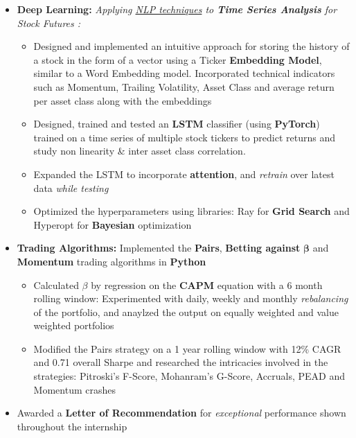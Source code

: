 \documentclass{article}
\begin{document}
\begin{itemize}[itemsep = -1 mm, leftmargin=*]
    \item \textbf{Deep Learning: }{\it Applying \underline{NLP techniques} to \textbf{Time Series Analysis} for Stock Futures :}
    \vspace{-6pt}
    \begin{itemize}[itemsep = -0.75 mm, leftmargin=*]
      \item Designed and implemented an intuitive approach for storing the history of a stock in the form of a vector using a Ticker \textbf{Embedding Model}, similar to a Word Embedding model. Incorporated technical indicators such as Momentum, Trailing Volatility, Asset Class and average return per asset class along with the embeddings
     \item Designed, trained and tested an \textbf{LSTM} classifier (using \textbf{PyTorch}) trained on a time series of multiple stock tickers to predict returns and study non linearity \& inter asset class correlation. 
     \item Expanded the LSTM to incorporate \textbf{attention}, and \textit{retrain} over latest data \textit{while testing}
     \item Optimized the hyperparameters using libraries: Ray for \textbf{Grid Search} and Hyperopt for \textbf{Bayesian} optimization
    \end{itemize}
    \vspace{-3pt}
    \item \textbf{Trading Algorithms:} Implemented the \textbf{Pairs}, \textbf{Betting against} $\bm{\beta}$ and \textbf{Momentum} trading algorithms in \textbf{Python}
    \vspace{-7pt}
    \begin{itemize}[itemsep = -0.75 mm, leftmargin=*]
      \item Calculated $\beta$ by regression on the \textbf{CAPM} equation with a 6 month rolling window: Experimented with daily, weekly and monthly \textit{rebalancing} of the portfolio, and anaylzed the output on equally weighted and value weighted portfolios
     \item Modified the Pairs strategy on a 1 year rolling window with 12\% CAGR and 0.71 overall Sharpe and researched the intricacies involved in the strategies:  Pitroski's F-Score, Mohanram's G-Score, Accruals, PEAD and Momentum crashes
    \end{itemize}
    \vspace{-3.5pt}
    \item Awarded a \textbf{Letter of Recommendation} for {\it exceptional} performance shown throughout the internship
\end{itemize}
\end{document}
